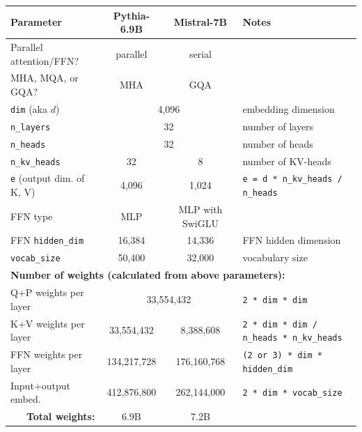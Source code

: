 \documentclass{article}
\begin{document}
\begingroup
\renewcommand{\arraystretch}{1.5} %
\begin{center} \begin{tabular}{|l|c|c|l|}                                                                      \hline
  \textbf{Parameter} & \textbf{Pythia-6.9B} & \textbf{Mistral-7B} & \textbf{Notes}                          \\ \hline
  Parallel attention/FFN? & parallel     & serial           & \cite{parallel}                               \\ \hline
  MHA, MQA, or GQA?       & MHA          & GQA              & \cite{vanilla, MQA, GQA}                      \\ \hline
  \verb+dim+ (aka $d$)    & \multicolumn{2}{c|}{4,096}      & embedding dimension                           \\ \hline
  \verb+n_layers+         & \multicolumn{2}{c|}{32}         & number of layers                              \\ \hline
  \verb+n_heads+          & \multicolumn{2}{c|}{32}         & number of heads                               \\ \hline
  \verb+n_kv_heads+       & 32           & 8                & number of KV-heads                            \\ \hline
  \verb+e+ (output dim. of K, V) & 4,096 & 1,024            & \verb+e = d * n_kv_heads / n_heads+           \\ \hline
  FFN type                & MLP          & MLP with SwiGLU  & \cite{GLU}                                    \\ \hline
  FFN \verb+hidden_dim+   & 16,384       & 14,336           & FFN hidden dimension                          \\ \hline
  \verb+vocab_size+       & 50,400       & 32,000           & vocabulary size                               \\ \hline

  \multicolumn{4}{|l|}{\textbf{Number of weights (calculated from above parameters):}}                      \\ \hline
  Q+P weights per layer   & \multicolumn{2}{c|}{33,554,432} & \verb+2 * dim * dim+                          \\ \hline
  K+V weights per layer   & 33,554,432   &   8,388,608      & \verb+2 * dim * dim / n_heads * n_kv_heads+   \\ \hline
  FFN weights per layer   & 134,217,728  & 176,160,768      & \verb+(2 or 3) * dim * hidden_dim+            \\ \hline
  Input+output embed.     & 412,876,800  & 262,144,000      & \verb+2 * dim * vocab_size+                   \\ \hline
  \multicolumn{1}{|r|}{\textbf{Total weights:}} & 6.9B & 7.2B &                                             \\ \hline


\end{tabular}
\end{center}
\end{document}
